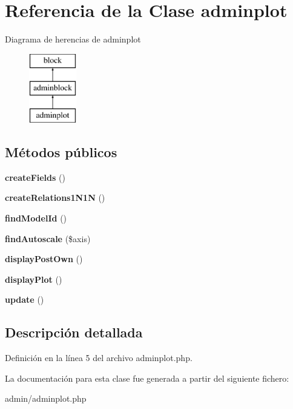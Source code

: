 \hypertarget{classadminplot}{\section{\-Referencia de la \-Clase adminplot}
\label{classadminplot}
}
\-Diagrama de herencias de adminplot\begin{figure}[H]
\begin{center}
\leavevmode
\includegraphics[height=3.000000cm]{classadminplot}
\end{center}
\end{figure}
\subsection*{\-Métodos públicos}
\begin{DoxyCompactItemize}
\item 
\hypertarget{classadminplot_a2a2a481056d85edf385da065689e1e00}{{\bfseries create\-Fields} ()}\label{classadminplot_a2a2a481056d85edf385da065689e1e00}

\item 
\hypertarget{classadminplot_a76a67aa739701746ba1d7e9ebf188b8b}{{\bfseries create\-Relations1\-N1\-N} ()}\label{classadminplot_a76a67aa739701746ba1d7e9ebf188b8b}

\item 
\hypertarget{classadminplot_a93304fb59e227ce3ec988112c1e94b03}{{\bfseries find\-Model\-Id} ()}\label{classadminplot_a93304fb59e227ce3ec988112c1e94b03}

\item 
\hypertarget{classadminplot_a3c9246442bd29d4c94d4df518eaafc05}{{\bfseries find\-Autoscale} (\$axis)}\label{classadminplot_a3c9246442bd29d4c94d4df518eaafc05}

\item 
\hypertarget{classadminplot_a7243383e1e65657bca4dd7e67d2fed48}{{\bfseries display\-Post\-Own} ()}\label{classadminplot_a7243383e1e65657bca4dd7e67d2fed48}

\item 
\hypertarget{classadminplot_a14ecb192e537e9861090cb2981dd5324}{{\bfseries display\-Plot} ()}\label{classadminplot_a14ecb192e537e9861090cb2981dd5324}

\item 
\hypertarget{classadminplot_adfbbf378d38bc707699a398dd35ea2ac}{{\bfseries update} ()}\label{classadminplot_adfbbf378d38bc707699a398dd35ea2ac}

\end{DoxyCompactItemize}


\subsection{\-Descripción detallada}


\-Definición en la línea 5 del archivo adminplot.\-php.



\-La documentación para esta clase fue generada a partir del siguiente fichero\-:\begin{DoxyCompactItemize}
\item 
admin/adminplot.\-php\end{DoxyCompactItemize}
